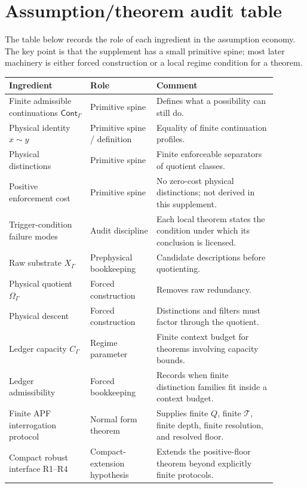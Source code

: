 \documentclass[11pt]{article}
\newcommand{\Cont}{\mathsf{Cont}}
\begin{document}
\section{Assumption/theorem audit table}\label{sec:audit-table}

The table below records the role of each ingredient in the assumption economy.  The key point is that the supplement has a small primitive spine; most later machinery is either forced construction or a local regime condition for a theorem.

\begin{center}
\begin{longtable}{@{}p{0.27\linewidth}p{0.22\linewidth}p{0.40\linewidth}@{}}
\toprule
Ingredient & Role & Comment \\
\midrule
Finite admissible continuations $\Cont_\Gamma$ & Primitive spine & Defines what a possibility can still do. \\
Physical identity $x\sim y$ & Primitive spine / definition & Equality of finite continuation profiles. \\
Physical distinctions & Primitive spine & Finite enforceable separators of quotient classes. \\
Positive enforcement cost & Primitive spine & No zero-cost physical distinctions; not derived in this supplement. \\
Trigger-condition failure modes & Audit discipline & Each local theorem states the condition under which its conclusion is licensed. \\
Raw substrate $X_\Gamma$ & Prephysical bookkeeping & Candidate descriptions before quotienting. \\
Physical quotient $\Omega_\Gamma$ & Forced construction & Removes raw redundancy. \\
Physical descent & Forced construction & Distinctions and filters must factor through the quotient. \\
Ledger capacity $C_\Gamma$ & Regime parameter & Finite context budget for theorems involving capacity bounds. \\
Ledger admissibility & Forced bookkeeping & Records when finite distinction families fit inside a context budget. \\
Finite APF interrogation protocol & Normal form theorem & Supplies finite $Q$, finite $\mathcal T$, finite depth, finite resolution, and resolved floor. \\
Compact robust interface R1--R4 & Compact-extension hypothesis & Extends the positive-floor theorem beyond explicitly finite protocols. \\

\end{longtable}
\end{center}
\end{document}
